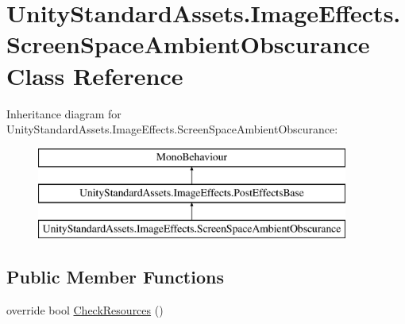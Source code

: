 \hypertarget{class_unity_standard_assets_1_1_image_effects_1_1_screen_space_ambient_obscurance}{}\section{Unity\+Standard\+Assets.\+Image\+Effects.\+Screen\+Space\+Ambient\+Obscurance Class Reference}
\label{class_unity_standard_assets_1_1_image_effects_1_1_screen_space_ambient_obscurance}
Inheritance diagram for Unity\+Standard\+Assets.\+Image\+Effects.\+Screen\+Space\+Ambient\+Obscurance\+:\begin{figure}[H]
\begin{center}
\leavevmode
\includegraphics[height=3.000000cm]{class_unity_standard_assets_1_1_image_effects_1_1_screen_space_ambient_obscurance}
\end{center}
\end{figure}
\subsection*{Public Member Functions}
\begin{DoxyCompactItemize}
\item 
override bool \mbox{\hyperlink{class_unity_standard_assets_1_1_image_effects_1_1_screen_space_ambient_obscurance_aa05dd1fc7e3faf1cee9c5bc09e840434}{Check\+Resources}} ()
\end{DoxyCompactItemize}
